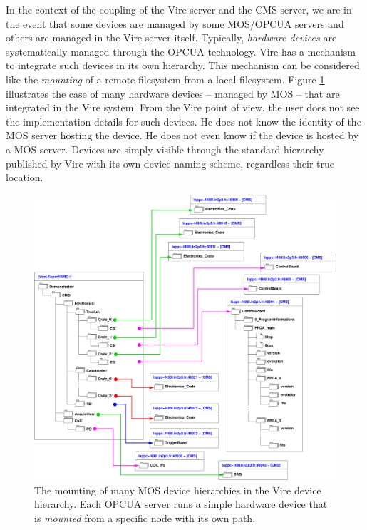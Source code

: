 In the context of the coupling of  the Vire server and the CMS server,
we are  in the event that  some devices are managed  by some MOS/OPCUA
servers and others are managed  in the Vire server itself.  Typically,
\emph{hardware devices}  are systematically managed through  the OPCUA
technology.  Vire has a mechanism to integrate such devices in its own
hierarchy.  This mechanism can  be considered like the \emph{mounting}
of   a   remote   filesystem   from  a   local   filesystem.    Figure
\ref{fig:an:mos_dev_0} illustrates  the case of many  hardware devices
-- managed by MOS -- that are integrated in the Vire system.  From the
Vire point of  view, the user does not see  the implementation details
for such  devices. He  does not  know the identity  of the  MOS server
hosting the device. He does not even know if the device is hosted by a
MOS server.  Devices are simply visible through the standard hierarchy
published by Vire with its  own device naming scheme, regardless their
true location.



\begin{figure}[h]
\begin{center}
\includegraphics[width=\linewidth]{appendix/images/MOS_device_example_0.pdf}
\end{center}
\caption{The  mounting of  many  MOS device  hierarchies  in the  Vire
  device hierarchy.  Each OPCUA server  runs a simple  hardware device
  that is \emph{mounted} from a specific node with its own path.
}\label{fig:an:mos_dev_0}
\end{figure}




